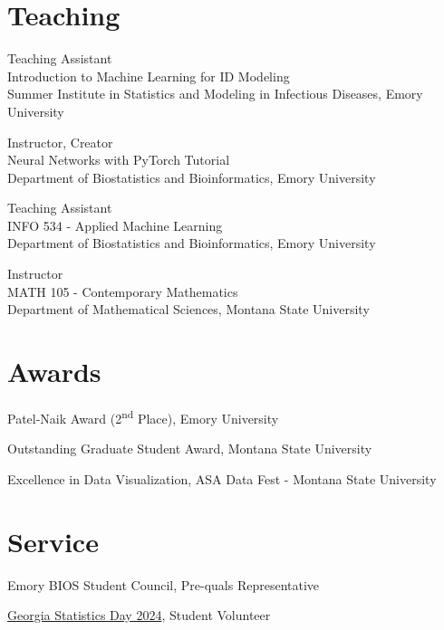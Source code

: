 \documentclass{wm_cv}
\begin{document}
\section{Teaching}

Teaching Assistant \hfill {} \\ 
    \indent \quad Introduction to Machine Learning for ID Modeling \\
   \indent \quad Summer Institute in Statistics and Modeling in Infectious Diseases, Emory University

Instructor, Creator \hfill {} \\ 
    \indent \quad Neural Networks with PyTorch Tutorial \\
   \indent \quad Department of Biostatistics and Bioinformatics, Emory University

Teaching Assistant \hfill {} \\ 
    \indent \quad INFO 534 - Applied Machine Learning  \\
   \indent \quad Department of Biostatistics and Bioinformatics, Emory University

Instructor \hfill {} \\ 
    \indent \quad MATH 105 - Contemporary Mathematics  \\
   \indent \quad Department of Mathematical Sciences, Montana State University


\section{Awards}

Patel-Naik Award (2\textsuperscript{nd} Place), Emory University \hfill {}

Outstanding Graduate Student Award, Montana State University \hfill {}  

Excellence in Data Visualization, ASA Data Fest - Montana State University \hfill  {}



\section{Service}

Emory BIOS Student Council, Pre-quals Representative \hfill  {}

\href{https://www.niss.org/events/georgia-statistics-day-2024}{Georgia Statistics Day 2024}, Student Volunteer \hfill  {}
\end{document}
